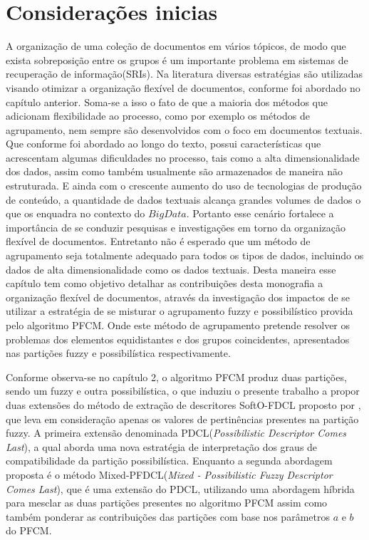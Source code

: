\section{Considerações inicias}
A organização de uma coleção de documentos em vários tópicos, de modo que exista sobreposição
entre os grupos é um importante problema em sistemas de recuperação de informação(SRIs). Na
literatura diversas estratégias são utilizadas visando otimizar a organização flexível de
documentos, conforme foi abordado no capítulo anterior. Soma-se a isso o fato de que a maioria dos
métodos que adicionam flexibilidade ao processo, como por exemplo  os métodos de agrupamento, nem
sempre são desenvolvidos com o foco em documentos textuais. Que conforme foi abordado ao longo do
texto, possui características que acrescentam algumas dificuldades no processo, tais como a alta
dimensionalidade dos dados, assim como também usualmente são armazenados de maneira não estruturada.
E ainda com o crescente aumento do uso de tecnologias de produção de conteúdo, a quantidade de dados
textuais alcança grandes volumes de dados o que os enquadra no contexto do $Big Data$. 
Portanto esse cenário fortalece a importância de se conduzir pesquisas e investigações em torno da
organização flexível de documentos. Entretanto não é esperado que um método de agrupamento seja
totalmente adequado para todos os tipos de dados, incluindo os dados de alta dimensionalidade como
os dados textuais\cite{Steinbach2004}. Desta maneira esse capítulo tem como objetivo detalhar as 
contribuições
desta monografia a organização flexível de documentos, através da investigação dos impactos de se
utilizar a estratégia de se misturar o agrupamento fuzzy e possibilístico provida pelo algoritmo
PFCM. Onde este método de agrupamento pretende resolver os problemas dos elementos equidistantes e 
dos grupos
coincidentes, apresentados nas partições fuzzy e possibilística respectivamente. 

Conforme observa-se no capítulo 2, o algoritmo PFCM produz duas
partições, sendo um fuzzy e outra possibilística, o que induziu o presente trabalho a propor duas
extensões do
método de extração de descritores SoftO-FDCL proposto por \cite{Nogueira2013}, que leva em
consideração apenas os valores de pertinências presentes na partição fuzzy. A primeira extensão
denominada PDCL({\it Possibilistic Descriptor Comes Last\/}), 
a qual aborda uma nova estratégia de interpretação dos graus de compatibilidade da partição
possibilística.
Enquanto a segunda abordagem proposta é o método 
Mixed-PFDCL({\it Mixed - Possibilistic Fuzzy Descriptor Comes Last\/}), 
que é uma extensão do PDCL, utilizando uma abordagem híbrida para mesclar as duas partições
presentes no algoritmo PFCM assim como também ponderar as
contribuições das partições com base nos parâmetros $a$ e $b$ do PFCM. 


